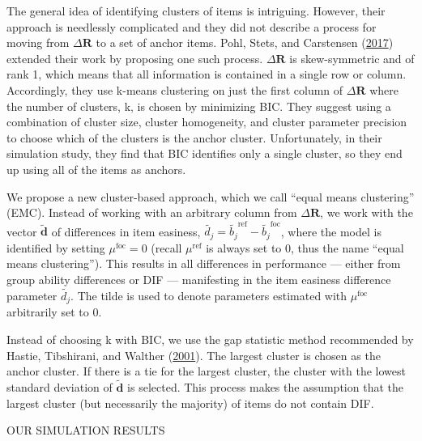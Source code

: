 \documentclass[
  11pt,
]{article}
\begin{document}
The general idea of identifying clusters of items is intriguing. However, their approach is needlessly complicated and they did not describe a process for moving from \(\Delta \mathbf{R}\) to a set of anchor items. Pohl, Stets, and Carstensen (\protect\hyperlink{ref-pohl2017cluster}{2017}) extended their work by proposing one such process. \(\Delta \mathbf{R}\) is skew-symmetric and of rank 1, which means that all information is contained in a single row or column. Accordingly, they use k-means clustering on just the first column of \(\Delta \mathbf{R}\) where the number of clusters, k, is chosen by minimizing BIC. They suggest using a combination of cluster size, cluster homogeneity, and cluster parameter precision to choose which of the clusters is the anchor cluster. Unfortunately, in their simulation study, they find that BIC identifies only a single cluster, so they end up using all of the items as anchors.

We propose a new cluster-based approach, which we call \enquote{equal means clustering} (EMC). Instead of working with an arbitrary column from \(\Delta \mathbf{R}\), we work with the vector \(\tilde{\mathbf{d}}\) of differences in item easiness, \(\tilde{d_j} = \tilde{b_j}^\text{ref} - \tilde{b_j}^\text{foc}\), where the model is identified by setting \(\mu^\text{foc} = 0\) (recall \(\mu^\text{ref}\) is always set to \(0\), thus the name \enquote{equal means clustering}). This results in all differences in performance --- either from group ability differences or DIF --- manifesting in the item easiness difference parameter \(\tilde{d_j}\). The tilde is used to denote parameters estimated with \(\mu^\text{foc}\) arbitrarily set to \(0\).

Instead of choosing k with BIC, we use the gap statistic method recommended by Hastie, Tibshirani, and Walther (\protect\hyperlink{ref-hastie2001estimating}{2001}). The largest cluster is chosen as the anchor cluster. If there is a tie for the largest cluster, the cluster with the lowest standard deviation of \(\tilde{\mathbf{d}}\) is selected. This process makes the assumption that the largest cluster (but necessarily the majority) of items do not contain DIF.

OUR SIMULATION RESULTS
\end{document}
